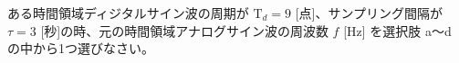 ある時間領域ディジタルサイン波の周期が $\textrm{T}_d = 9$ [点]、サンプリング間隔が $\tau = 3$ [秒]の時、元の時間領域アナログサイン波の周波数 $f$ [Hz] を選択肢 a〜d の中から1つ選びなさい。
